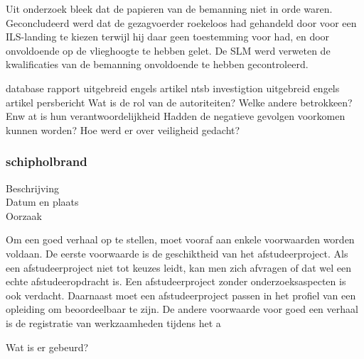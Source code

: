 Uit onderzoek bleek dat de papieren van de bemanning niet in orde waren. 
Geconcludeerd werd dat de gezagvoerder roekeloos had gehandeld door voor een ILS-landing te kiezen terwijl hij daar geen toestemming voor had, en door onvoldoende op de vlieghoogte te hebben gelet. 
De SLM werd verweten de kwalificaties van de bemanning onvoldoende te hebben gecontroleerd.

 

\cite{espnSLMterugblik}
\cite{dennisRosier01052020}
\cite{hassing07062020slmramp}
\cite{amsterdamArchiefSLM}
\cite{rtvOost06062019nabestaande}
\cite{breda07062021AndroSnel}
\cite{andereTijdenSLMCrash}
\cite{wikiSLMRamp}
database
\cite{aviationReport}
rapport
\cite{aviationSLMCrashAccidentInvestigation}
\cite{mcDonnelDouglasCommissionReportSLMCrash}
\cite{wikiSRFlight764}
\cite{nos07062019SLMTerugblik}
\cite{dagvantoenSLMCrash}
\cite{waterkantNesty07061989}
uitgebreid engels artikel
\cite{eduNandlalSRCrash}
ntsb investigtion
\cite{oldjetsSRAirways}
uitgebreid engels artikel
\cite{cloudberg02012021srflight764}
persbericht
\cite{apnews07061989srplanecrash}
Wat is de rol van de autoriteiten?
Welke andere betrokkeen? Enw at is hun verantwoordelijkheid
Hadden de negatieve gevolgen voorkomen kunnen worden?
Hoe werd er over veiligheid gedacht?



\subsubsection{schipholbrand}

\begin{description}
\item[Beschrijving]
\item[Datum en plaats] 
\item[Oorzaak]
\end{description}
Om een goed verhaal op te stellen, moet vooraf aan enkele voorwaarden
worden voldaan. De eerste voorwaarde is de geschiktheid van het
afstudeerproject. Als een afstudeerproject niet tot keuzes leidt, kan
men zich afvragen of dat wel een echte afstudeeropdracht is. Een
afstudeerproject zonder onderzoeksaspecten is ook verdacht. Daarnaast
moet een afstudeerproject passen in het profiel van een opleiding om
beoordeelbaar te zijn. De andere voorwaarde voor goed een verhaal is
de registratie van werkzaamheden tijdens het a


Wat is er gebeurd?

